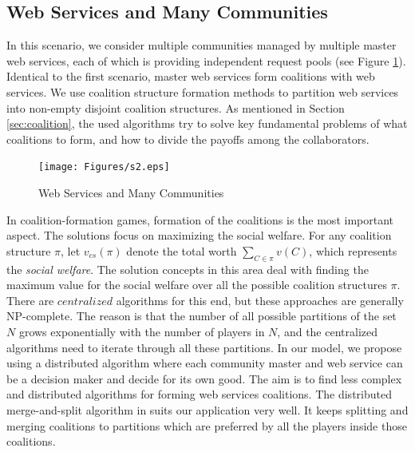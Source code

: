 \subsection {Web Services and Many Communities}

In this scenario, we consider multiple communities managed by
multiple master web services, each of which is providing
independent request pools (see Figure \ref{fig_sim2}). Identical
to the first scenario, master web services form coalitions with
web services. We use coalition structure formation methods to
partition web services into non-empty disjoint coalition
structures. As mentioned in Section \ref{sec:coalition}, the used
algorithms \cite{Sandholm:1999:CSG:317145.317152,DBLP:conf/ijcai/GrecoMPS11,DBLP:conf/ijcai/RahwanMJ11} try to
solve key fundamental problems of what coalitions to form, and how
to divide the payoffs among the collaborators.

\begin{figure}[!t]
\centering
\texttt{[image: Figures/s2.eps]}
\caption{Web Services and Many Communities}
\label{fig_sim2}
\end{figure}

In coalition-formation games, formation of the coalitions is the
most important aspect. The solutions focus on maximizing the
social welfare. For any coalition structure $\pi$, let
$v_{cs}(\pi)$ denote the total worth $\sum_{C \in \pi}{v(C)}$,
which represents the \emph{social welfare}. The solution concepts
in this area deal with finding the maximum value for the social
welfare over all the possible coalition structures $\pi$. There
are $centralized$ algorithms for this end, but these approaches
are generally NP-complete. The reason is that the number of all
possible partitions of the set $N$ grows exponentially with the
number of players in $N$, and the centralized algorithms need to
iterate through all these partitions.
In our model, we propose using a distributed algorithm where each
community master and web service can be a decision maker and
decide for its own good. The aim is to find less complex and
distributed algorithms for forming web services
coalitions\cite{DBLP:journals/igtr/AptW09,Dieckmann02dynamiccoalition,ray2007game}.
The distributed merge-and-split algorithm in
\cite{DBLP:journals/igtr/AptW09} suits our application very well.
It keeps splitting and merging coalitions to partitions which are
preferred by all the players inside those coalitions.

